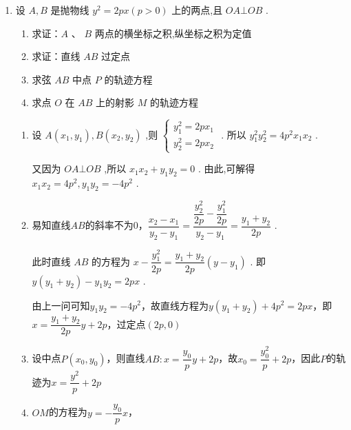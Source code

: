 \begin{enumerate}
\begin{enumerate}
\begin{jieda}
\begin{enumerate}
                反例：取抛物线上的点 $A\left( {2,2}\right) ,B\left( {\dfrac{1}{2},1}\right)$ ,此时 $\vv{OA} \cdot  \vv{OB} = 3$ ,直线 ${AB}$ 的方程为 $y = \dfrac{2}{3}\left( {x + 1}\right)$ ,而 $T\left( {3,0}\right)$ 不在直线 ${AB}$ 上.
            \end{enumerate}
        \end{jieda}
        \item 设 $A,B$ 是抛物线 ${y}^{2} = {2px}\left( {p > 0}\right)$ 上的两点,且 ${OA} \bot  {OB}$ .
        \begin{enumerate}
            \item 求证：$A$ 、 $B$ 两点的横坐标之积,纵坐标之积为定值
            \item 求证：直线 ${AB}$ 过定点
            \item 求弦 ${AB}$ 中点 $P$ 的轨迹方程
            \item 求点 $O$ 在 ${AB}$ 上的射影 $M$ 的轨迹方程
        \end{enumerate}
        \begin{jieda}
            \begin{enumerate}
                \item 设 $A\left( {{x}_{1},{y}_{1}}\right) ,B\left( {{x}_{2},{y}_{2}}\right)$ ,则 $\left\{\begin{array}{l}
                     {y}_{1}^{2} = {2p}{x}_{1}  \\
                     {y}_{2}^{2} = {2p}{x}_{2}
                \end{array}\right.$ . 所以 ${y}_{1}^{2}{y}_{2}^{2} = 4{p}^{2}{x}_{1}{x}_{2}$ .
                
                又因为 ${OA} \bot  {OB}$ ,所以 ${x}_{1}{x}_{2} + {y}_{1}{y}_{2} = 0$ . 由此,可解得 ${x}_{1}{x}_{2} = 4{p}^{2},{y}_{1}{y}_{2} =  - 4{p}^{2}$ .
                \item 易知直线$AB$的斜率不为0，$\dfrac{{x}_{2} - {x}_{1}}{{y}_{2} - {y}_{1}} = \dfrac{\dfrac{{y}_{2}^{2}}{2p} - \dfrac{{y}_{1}^{2}}{2p}}{{y}_{2} - {y}_{1}} = \dfrac{{y}_{1} + {y}_{2}}{2p}$ .
                
                此时直线 ${AB}$ 的方程为 $x - \dfrac{{y}_{1}^{2}}{2p} = \dfrac{{y}_{1} + {y}_{2}}{2p}\left( y - y_1\right)$ . 即 $y\left( {{y}_{1} + {y}_{2}}\right)  - {y}_{1}{y}_{2} = {2px}$ . 
    
                由上一问可知${y}_{1}{y}_{2} =  - 4{p}^{2}$，故直线方程为$y\left( {{y}_{1} + {y}_{2}}\right)  +4p^2 = {2px}$，即$x = \dfrac{y_1+y_2}{2p} y + 2p$，过定点$(2p, 0)$
                \item 设中点$P(x_0, y_0)$，则直线$AB: x = \dfrac{y_0}{p} y + 2p$，故$x_0 = \dfrac{y_0^2}{p}+2p$，因此$P$的轨迹为$x = \dfrac{y^2}{p}+2p$
                \item $OM$的方程为$y = -\dfrac{y_0}{p}x$，
                

\end{enumerate}
\end{jieda}
\end{enumerate}
\end{enumerate}
